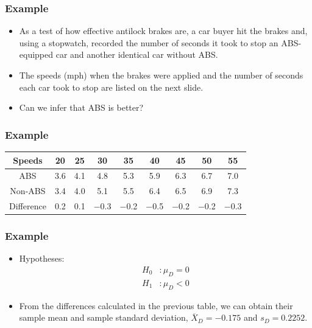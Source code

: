 \documentclass[12pt]{beamer}
\begin{document}
\begin{frame}
	\frametitle{Example}
	
	\begin{itemize}[label={\color{blue}$\blacktriangleright$}]
		\item As a test of how effective antilock brakes are, a car buyer hit the brakes and, using a stopwatch, recorded the number of seconds it took to stop an ABS-equipped car and another identical car without ABS.
		
		\item The speeds (mph) when the brakes were applied and the number of seconds each car took to stop are listed on the next slide.
		
		\item Can we infer that ABS is better?
	\end{itemize}
	
\end{frame}
\begin{frame}
	\frametitle{Example}
	
	\begin{center}
		\begin{tabular}{ccccccccc}
			\toprule
			Speeds & 20 & 25 & 30 & 35 & 40 & 45 & 50 & 55 \\
			\midrule
			ABS & 3.6 & 4.1 & 4.8 & 5.3 & 5.9 & 6.3 & 6.7 & 7.0 \\
			Non-ABS & 3.4 & 4.0 & 5.1 & 5.5 & 6.4 & 6.5 & 6.9 & 7.3 \\
			\midrule
			Difference & 0.2 & 0.1 & $-$0.3 & $-$0.2 & $-$0.5 & $-$0.2 & $-$0.2 & $-$0.3 \\
			\bottomrule
		\end{tabular}
	\end{center}
	
	\end{frame}
	\begin{frame}
		\frametitle{Example}
		
		\begin{itemize}[label={\color{blue}$\blacktriangleright$}]
			\item Hypotheses:
			\[
			\begin{aligned}
				H_0 &: \mu_D = 0 \\
				H_1 &: \mu_D < 0
			\end{aligned}
			\]
			
			\item From the differences calculated in the previous table, we can obtain their sample mean and sample standard deviation, $\overline{X}_D = -0.175$ and $s_D = 0.2252$.
		\end{itemize}
		
	\end{frame}
\end{document}
